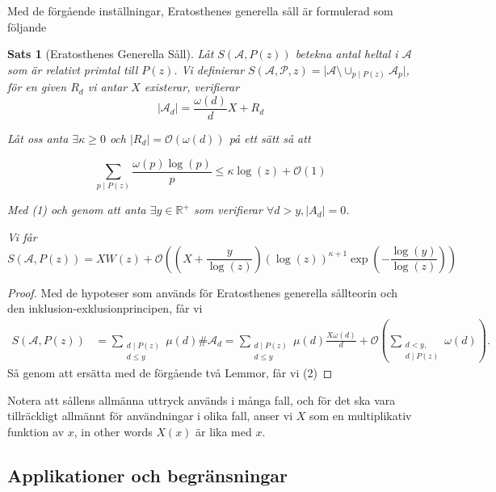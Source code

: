 \documentclass[12pt,a4paper]{article}
\newcommand{\divides}{\mid}
\newcommand{\A}{\mathcal{A}}
\renewcommand{\P}{\mathcal{P}}
\renewcommand{\S}[3]{S(\mathcal{#1}, \mathcal{#2}, #3)}
\newtheorem{theorem}{Sats}[section]
\newtheorem{proof}{Bevis}
\begin{document}
Med de förgående inställningar, Eratosthenes generella såll är formulerad som följande\cite{Dalton}
\begin{theorem}[Eratosthenes Generella Såll]\hfill

Låt $ S(\A, P(z)) $ betekna antal heltal i $ \A $ som är relativt primtal till $ P(z) $.
Vi definierar $\S\A\P z =\vert \A \setminus \cup_{p\divides P(z)}\A_{p}\vert$, för en given $ R_{d} $ vi antar $ X $ existerar, verifierar
\[\vert\A_{d}\vert =\frac{\omega(d)}{d}X +R_{d} \]

Låt oss anta $ \exists \kappa\geq 0 $ och $ \vert R_{d}\vert = \mathcal{O}(\omega(d))$ på ett sätt så att

\[\sum_{p\divides P(z)}\frac{\omega(p)\log(p)}{p}\leq \kappa \log(z)+\mathcal{O}(1)\]


Med (1) och genom att anta $ \exists y\in \mathbb{R}^{+} $ som verifierar $ \forall d>y, \vert A_{d}\vert=0 $.

Vi får
\begin{equation}
S(\A, P(z))= XW(z)+\mathcal{O}\left( \left( X+\frac{y}{\log(z)} \right)(\log(z))^{\kappa+1}\exp \left( -\frac{\log(y)}{\log(z)} \right) \right)
\end{equation}
\end{theorem}
\begin{proof}
Med de hypoteser som används för Eratosthenes generella sållteorin och den inklusion-exklusionprincipen, får vi
\begin{align*}
S(\A, P(z))&=\sum_{\substack{d\divides P(z)\\d\leq y}}\mu(d)\#\A_{d} =\sum_{\substack{d\divides P(z)\\d\leq y}}\mu(d)\frac{X\omega(d)}{d}+\mathcal{O}(\sum_{\substack{d<y,\\ d \divides P(z)}} \omega(d)).
\end{align*}
Så genom att ersätta med de förgående två Lemmor, får vi (2)
\end{proof}
Notera att sållens allmänna uttryck används i många fall, och för det ska vara tillräckligt allmännt för användningar i olika fall, anser vi $ X $ som en multiplikativ funktion av $ x $, in other words $ X(x) $ är lika med $ x $. 

\subsection{Applikationer och begränsningar}
\end{document}
